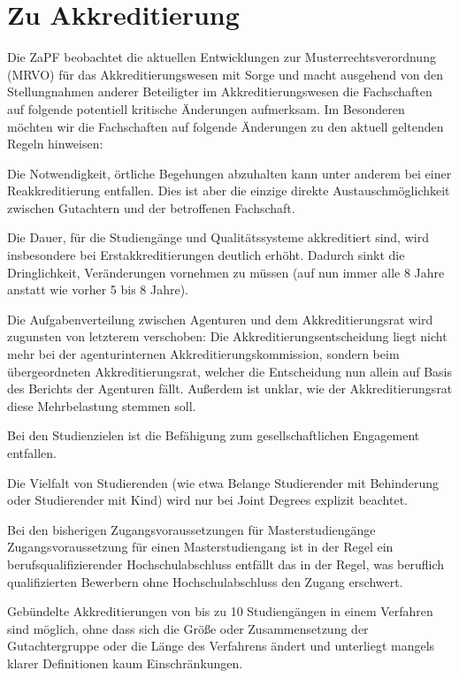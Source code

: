\documentclass[DIV=calc]{scrartcl}
\begin{document}
\section*{Zu Akkreditierung}
Die ZaPF beobachtet die aktuellen Entwicklungen
zur Musterrechtsverordnung (MRVO) für das Akkreditierungswesen mit Sorge und macht ausgehend von den Stellungnahmen anderer Beteiligter im Akkreditierungswesen die Fachschaften auf folgende potentiell kritische Änderungen aufmerksam.
Im Besonderen möchten wir die Fachschaften auf folgende Änderungen zu den aktuell geltenden Regeln hinweisen:
\begin{compactitem}
\item Die Notwendigkeit, örtliche Begehungen abzuhalten kann unter anderem bei einer Reakkreditierung entfallen. Dies ist aber die einzige direkte Austauschmöglichkeit zwischen Gutachtern und der betroffenen Fachschaft.
\item Die Dauer, für die Studiengänge und Qualitätssysteme akkreditiert sind, wird insbesondere bei Erstakkreditierungen deutlich erhöht. Dadurch sinkt die Dringlichkeit, Veränderungen vornehmen zu müssen (auf nun immer alle 8 Jahre anstatt wie vorher 5 bis 8 Jahre).
\item Die Aufgabenverteilung zwischen Agenturen und dem Akkreditierungsrat wird zugunsten von letzterem verschoben: Die Akkreditierungsentscheidung liegt nicht mehr bei der agenturinternen Akkreditierungskommission, sondern beim übergeordneten Akkreditierungsrat, welcher die Entscheidung nun allein auf Basis des Berichts der Agenturen fällt. Außerdem ist unklar, wie der Akkreditierungsrat diese Mehrbelastung stemmen soll.
\item Bei den Studienzielen ist die Befähigung zum gesellschaftlichen Engagement entfallen.
\item Die Vielfalt von Studierenden (wie etwa Belange Studierender mit Behinderung oder Studierender mit Kind) wird nur bei Joint Degrees explizit beachtet.
\item Bei den bisherigen Zugangsvoraussetzungen für Masterstudiengänge \glqq Zugangsvoraussetzung für einen Masterstudiengang ist in der Regel ein berufsqualifizierender Hochschulabschluss\grqq{} entfällt das \glqq in der Regel\grqq{}, was beruflich qualifizierten Bewerbern ohne Hochschulabschluss den Zugang erschwert.
\item Gebündelte Akkreditierungen von bis zu 10 Studiengängen in einem Verfahren sind möglich, ohne dass sich die Größe oder Zusammensetzung der Gutachtergruppe oder die Länge des Verfahrens ändert und unterliegt mangels klarer Definitionen kaum Einschränkungen.

\end{compactitem}
\end{document}
